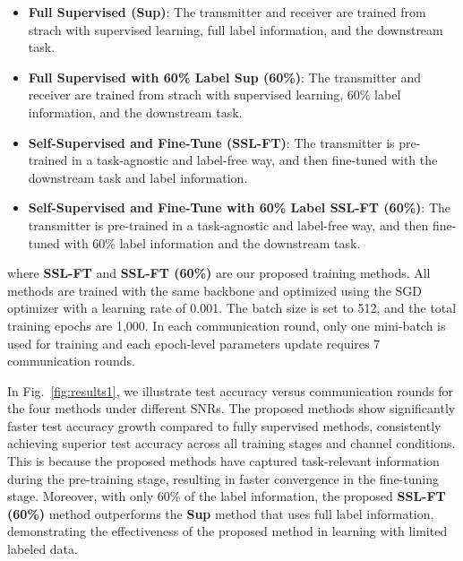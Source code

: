 \begin{itemize}
    \item \textbf{Full Supervised (Sup)}: The transmitter and receiver are trained from strach with supervised learning, full label information, and the downstream task.
    \item \textbf{Full Supervised with 60\% Label \stretchrel*{\textbf{(}}{\strut}Sup (60\%)\stretchrel{\textbf{)}}{\strut}}: The transmitter and receiver are trained from strach with supervised learning, 60\% label information, and the downstream task.
    \item \textbf{Self-Supervised and Fine-Tune (SSL-FT)}: The transmitter is pre-trained in a task-agnostic and label-free way, and then fine-tuned with the downstream task and label information.
    \item \textbf{Self-Supervised and Fine-Tune with 60\% Label \stretchrel*{\textbf{(}}{\strut}SSL-FT (60\%)\stretchrel{\textbf{)}}{\strut}}: The transmitter is pre-trained in a task-agnostic and label-free way, and then fine-tuned with 60\% label information and the downstream task.
\end{itemize}
where \textbf{SSL-FT} and \textbf{SSL-FT (60\%)} are our proposed training methods. All methods are trained with the same backbone and optimized using the SGD optimizer with a learning rate of 0.001. The batch size is set to 512, and the total training epochs are 1,000. In each communication round, only one mini-batch is used for training and each epoch-level parameters update requires 7 communication rounds.

In Fig.~\ref{fig:results1}, we illustrate test accuracy versus communication rounds for the four methods under different SNRs. The proposed methods show significantly faster test accuracy growth compared to fully supervised methods, consistently achieving superior test accuracy across all training stages and channel conditions. This is because the proposed methods have captured task-relevant information during the pre-training stage, resulting in faster convergence in the fine-tuning stage. Moreover, with only 60\% of the label information, the proposed \textbf{SSL-FT (60\%)} method outperforms the \textbf{Sup} method that uses full label information, demonstrating the effectiveness of the proposed method in learning with limited labeled data.

